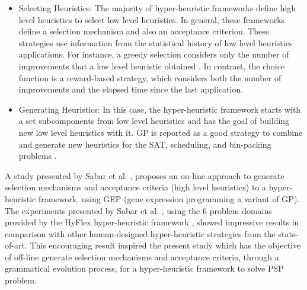 \documentclass[conference]{IEEEtran}
\begin{document}
\begin{itemize}
	\item Selecting Heuristics: The majority of hyper-heuristic frameworks define high level heuristics to select low level heuristics. In general, these frameworks define a selection mechanism and also an acceptance criterion. These strategies use information from the statistical history of low level heuristics applications. For instance, a greedy selection considers only the number of improvements that a low level heuristic obtained \cite{burke2013hyper}. In contrast, the choice function \cite{burke2013hyper} is a reward-based strategy, which considers both the number of improvements and the elapsed time since the last application.
	
	
	
	
	
	
	
	
	
%	
	

	\item Generating Heuristics: In this case, the hyper-heuristic framework starts with a set subcomponents from low level heuristics and has the goal of building new low level heuristics with it. GP is reported as a good strategy to combine and generate new heuristics for the SAT, scheduling, and bin-packing problems \cite{sabar2015automatic}.
\end{itemize}


A study presented by Sabar et al. \cite{sabar2015automatic}, proposes an on-line approach to generate selection mechanisms and acceptance criteria (high level heuristics) to a hyper-heuristic framework, using GEP \cite{ferreira2008gene} (gene expression programming a variant of GP). The experiments presented by Sabar et al. \cite{sabar2015automatic}, using the 6 problem domains provided by the HyFlex hyper-heuristic framework \cite{ochoa2012hyflex}, showed impressive   results in  comparison  with other human-designed hyper-heuristic strategies from the state-of-art. This encouraging result inspired the present study which has the objective of
off-line generate selection mechanisms and acceptance criteria, through a grammatical evolution process, for a hyper-heuristic framework to solve PSP problem.
\end{document}
